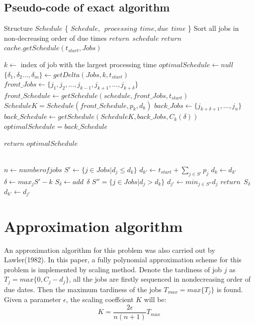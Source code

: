 \documentclass[11pt]{article}
\begin{document}
\subsection{Pseudo-code of exact algorithm}
\begin{algorithmic}
\State Structure $Schedule$ \{ $Schedule,\ \ processing\ \ time, due\ \ time $ \}
\State Sort all jobs in non-decreasing order of due times
    \State $return\ \ schedule$
\EndIf
{}
    \State $return$ $cache.getSchedule(t_{start},Jobs)$
\EndIf

\State $k \gets$ index of job with the largest processing time
\State $optimalSchedule\gets null$
\State $\{ \delta_{1},\delta_{2}..., \delta_{m} \} \gets getDelta(Jobs, k, t_{start})$
\State $front\_Jobs \gets \{ j_1,j_2,...,j_{k-1},j_{k+1},...,j_{k+\delta }\}$
\State $front\_Schedule \gets getSchedule(schedule,front\_Jobs,t_{start})$ 
\State $ScheduleK= Schedule(front\_Schedule,p_k,d_k)$
\State $back\_Jobs \gets \{j_{k+\delta+1},...,j_{n}\}$
\State $back\_Schedule \gets getSchedule(ScheduleK,back\_Jobs,C_k(\delta))$
    \State $optimalSchedule=back\_Schedule$
\EndIf
    
\EndFor
\State $return$ $optimalSchedule$


 
\EndFunction\\
\State $n\gets number of jobs$
\State $S' \gets \{j \in Jobs|d_j\leq d_k\}$
\State $d_{k'}\gets t_{start}+\sum _{j\in S'}p_j$
    \State $d_k\gets d_{k'}$
\EndIf
\State $\delta \gets max_j{S'}-k$
\State $S_{\delta}\gets add \ \ \delta$
\State $S''=\{j\in Jobs|d_j>d_k\}$
\State $d_{j'}\gets min_{j\in S''}d_j$
    \State $return \ \ S_{\delta}$
\EndIf
\State $d_{k'}\gets d_{j'}$
\EndWhile
\EndFunction
\end{algorithmic}
\section{Approximation algorithm}
An approximation algorithm for this problem was also carried out by Lawler(1982). In this paper, a fully polynomial approximation scheme for this problem is implemented by scaling method. Denote the tardiness of job $j$ as $T_j=max\{ 0,C_j-d_j\}$, all the jobs are firstly sequenced in nondecreasing order of due dates. Then the maximum tardiness of the jobs $T_{max}=max\{ T_j\}$ is found. Given a parameter $\epsilon$, the scaling coeffcient $K$ will be: 
$$K=\frac{2\epsilon}{n(n+1)}T_{max}$$
\end{document}
